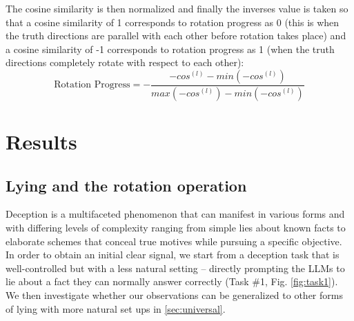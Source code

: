 \documentclass[]{paper}
\begin{document}
The cosine similarity is then normalized and finally the inverses value is taken so that a cosine similarity of 1 corresponds to rotation progress as 0 (this is when the truth directions are parallel with each other before rotation takes place) and a cosine similarity of -1 corresponds to rotation progress as 1 (when the truth directions completely rotate with respect to each other):
\begin{equation} \label{eq:rotation_progress}
\text{Rotation Progress}  = - \frac{{-cos}^{(l)} - min({-cos}^{(l)})}{max({-cos}^{(l)}) - min({-cos}^{(l)}) } 
\end{equation} 






\section{Results}

\subsection{Lying and the rotation operation}
\label{sec: behavior_results}

Deception is a multifaceted phenomenon that can manifest in various forms and with differing levels of complexity ranging from simple lies about known facts to elaborate schemes that conceal true motives while pursuing a specific objective. In order to obtain an initial clear signal, we start from a deception task that is well-controlled but with a less natural setting – directly prompting the LLMs to lie about a fact they can normally answer correctly (Task \#1, Fig. \ref{fig:task1}). We then investigate whether our observations can be generalized to other forms of lying with more natural set ups in \ref{sec:universal}. 
\end{document}
